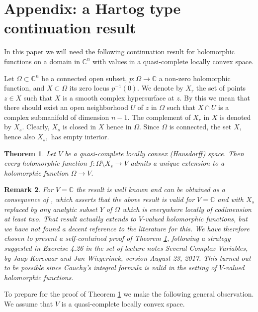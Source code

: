 \documentclass[12pt,a4paper]{article}
\newtheorem{Thm}{Theorem}
\newtheorem{Rem}[Thm]{Remark}
\newenvironment{thm}[0]{\begin{Thm}\noindent}%
{\end{Thm}}
\newenvironment{rem}[0]{\begin{Rem}\noindent\rm}%
{\end{Rem}}
\def\msy#1{{\mathbb #1}}
\def\C{{\msy C}}
\def\to{\rightarrow}
\numberwithin{Thm}{section}
\numberwithin{equation}{section}
\numberwithin{equation}{section}
\begin{document}
\section{Appendix: a Hartog type continuation result}
\label{s: Hartog thm}
In this paper we will need the following continuation result for holomorphic functions
on a domain in $\C^n$ with values in a quasi-complete locally convex space. 

Let $\Omega \subset \C^n$ be a connected
open subset, $p: \Omega \to \C$ a non-zero holomorphic function, and $X \subset \Omega$ 
its zero locus $p^{-1}(0).$  We denote by $X_r$ the set of points $z \in X$ such 
that $X$ is a smooth complex hypersurface at $z.$ By this we mean that there should exist an open neighborhood $U$ of $z$ in $\Omega$ such that $X\cap U$ is a complex submanifold of dimension $n-1.$ The complement of $X_r$ in $X$ is denoted by $X_s.$ Clearly, $X_s$ is closed in $X$ hence in 
$\Omega.$ Since $\Omega$ is connected, the set $X,$ hence also $X_s,$ has empty interior.  
%

\begin{thm}
\label{t: Hartog type continuation}
Let $V$ be a quasi-complete locally convex (Hausdorff) space. Then every holomorphic function $f: \Omega \setminus X_s \to V$ admits a unique extension to a holomorphic function $\Omega \to V.$ 
\end{thm}

\begin{rem}
For $V = \C$ the result is well known and can be obtained as a consequence
of \cite[Thm.~6.12]{FGhol}, which asserts that the above result is valid for $V =\C$ and 
with $X_s$ replaced by any analytic subset $Y$ of $\Omega$ which is 
everywhere locally of codimension at least two. That result actually extends to $V$-valued holomorphic functions, but we have not found a decent reference to the literature for this.  
We have therefore chosen to present a self-contained proof of Theorem \ref{t: Hartog type continuation}, following a strategy suggested in Exercise 4.26 in the set of lecture notes
{\em Several Complex Variables}, by Jaap Korevaar and Jan Wiegerinck, version August 23, 2017.
This turned out to be possible since Cauchy's integral formula is valid in the setting of $V$-valued holomorphic functions.
\end{rem}

To prepare for the proof of Theorem \ref{t: Hartog type continuation} we make the following general observation. We assume that $V$ is a quasi-complete locally convex space. 
\end{document}

